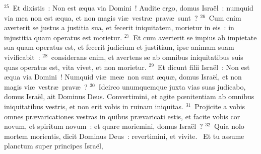 ${}^{25}$~Et dixistis~: Non est \ae qua via Domini~! Audite ergo, domus Isra\"el~: numquid via mea non est \ae qua, et non magis vi\ae\ vestr\ae\ prav\ae\ sunt~?
${}^{26}$~Cum enim averterit se justus a justitia sua, et fecerit iniquitatem, morietur in eis~: in injustitia quam operatus est morietur.
${}^{27}$~Et cum averterit se impius ab impietate sua quam operatus est, et fecerit judicium et justitiam, ipse animam suam vivificabit~:
${}^{28}$~considerans enim, et avertens se ab omnibus iniquitatibus suis quas operatus est, vita vivet, et non morietur.
${}^{29}$~Et dicunt filii Isra\"el~: Non est \ae qua via Domini~! Numquid vi\ae\ me\ae\ non sunt \ae qu\ae , domus Isra\"el, et non magis vi\ae\ vestr\ae\ prav\ae~?
${}^{30}$~Idcirco unumquemque juxta vias suas judicabo, domus Isra\"el, ait Dominus Deus. Convertimini, et agite pœnitentiam ab omnibus iniquitatibus vestris, et non erit vobis in ruinam iniquitas.
${}^{31}$~Projicite a vobis omnes pr\ae varicationes vestras in quibus pr\ae varicati estis, et facite vobis cor novum, et spiritum novum~: et quare moriemini, domus Isra\"el~?
${}^{32}$~Quia nolo mortem morientis, dicit Dominus Deus~: revertimini, et vivite.
~Et tu assume planctum super principes Isra\"el,
